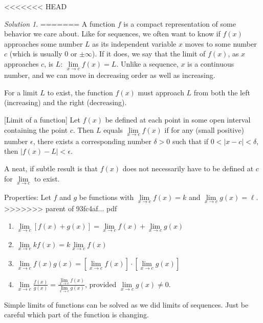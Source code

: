 \documentclass[]{book}
\providecommand{\tightlist}{%
  \setlength{\itemsep}{0pt}\setlength{\parskip}{0pt}}
\theoremstyle{definition}
\theoremstyle{definition}
\theoremstyle{definition}
\theoremstyle{remark}
\newtheorem*{solution}{Solution}
\begin{document}
<<<<<<< HEAD
\begin{solution}
{}
=======
A function \(f\) is a compact representation of some behavior we care about. Like for sequences, we often want to know if \(f(x)\) approaches some number \(L\) as its independent variable \(x\) moves to some number \(c\) (which is usually 0 or \(\pm\infty\)). If it does, we say that the limit of \(f(x)\), as \(x\) approaches \(c\), is \(L\): \(\lim\limits_{x \to c} f(x)=L\). Unlike a sequence, \(x\) is a continuous number, and we can move in decreasing order as well as increasing.

For a limit \(L\) to exist, the function \(f(x)\) must approach \(L\) from both the left (increasing) and the right (decreasing).

[Limit of a function]
\protect\hypertarget{def:unnamed-chunk-5}{}{\label{def:unnamed-chunk-5} {} }Let \(f(x)\) be defined at each point in some open interval containing the point \(c\). Then \(L\) equals \(\lim\limits_{x \to c} f(x)\) if for any (small positive) number \(\epsilon\), there exists a corresponding number \(\delta>0\) such that if \(0<|x-c|<\delta\), then \(|f(x)-L|<\epsilon\).

A neat, if subtle result is that \(f(x)\) does not necessarily have to be defined at \(c\) for \(\lim\limits_{x \to c}\) to exist.

Properties: Let \(f\) and \(g\) be functions with \(\lim\limits_{x \to c} f(x)=k\) and \(\lim\limits_{x \to c} g(x)=\ell\).
>>>>>>> parent of 93fc4af... pdf

\begin{enumerate}
\def\labelenumi{\arabic{enumi}.}
\tightlist
\item
  \(\lim\limits_{x \to c}[f(x)+g(x)]=\lim\limits_{x \to c} f(x)+ \lim\limits_{x \to c} g(x)\)
\item
  \(\lim\limits_{x \to c} kf(x) = k\lim\limits_{x \to c} f(x)\)
\item
  \(\lim\limits_{x \to c} f(x) g(x) = \left[\lim\limits_{x \to c} f(x)\right]\cdot \left[\lim\limits_{x \to c} g(x)\right]\)
\item
  \(\lim\limits_{x \to c} \frac{f(x)}{g(x)} = \frac{\lim\limits_{x \to c} f(x)}{\lim\limits_{x \to c} g(x)}\), provided \(\lim\limits_{x \to c} g(x)\ne 0\).
\end{enumerate}

Simple limits of functions can be solved as we did limits of sequences. Just be careful which part of the function is changing.


\end{solution}
\end{document}
